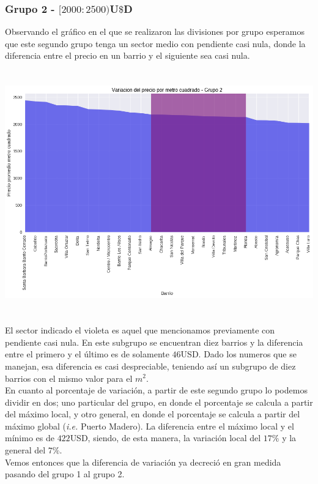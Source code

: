 \documentclass[a4paper, 10pt]{article}
\newcommand\tab[1][0.5cm]{\hspace*{#1}}
\begin{document}
				\subsubsection{Grupo 2 - $[2000:2500)$U$\$$D}
					Observando el gráfico en el que se realizaron las divisiones por grupo esperamos que este segundo grupo
					tenga un sector medio con pendiente casi nula, donde la diferencia entre el precio en un barrio y el
					siguiente sea casi nula.
					\begin{center}
   		    				\includegraphics[width=6in, height=4.13in]{images/m2Group2Area}
				  	\end{center}
				  	\tab El sector indicado el violeta es aquel que mencionamos previamente con pendiente casi nula. En este
				  	subgrupo se encuentran diez barrios y la diferencia entre el primero y el último es de solamente $46$USD.
				  	Dado los numeros que se manejan, esa diferencia es casi despreciable, teniendo así un subgrupo de diez 
				  	barrios con el mismo valor para el $m^2$. \\
				  	\tab En cuanto al porcentaje de variación, a partir de este segundo grupo lo podemos dividir en dos; uno
				  	particular del grupo, en donde el porcentaje se calcula a partir del máximo local, y otro general, en donde
				  	el porcentaje se calcula a partir del máximo global (\emph{i.e.} Puerto Madero). La diferencia entre el
				  	máximo local y el mínimo es de $422$USD, siendo, de esta manera, la variación local del $17\%$ y la general
				  	del $7\%$. \\
				  	\tab Vemos entonces que la diferencia de variación ya decreció en gran medida pasando del grupo 1 al grupo 2.
\end{document}
